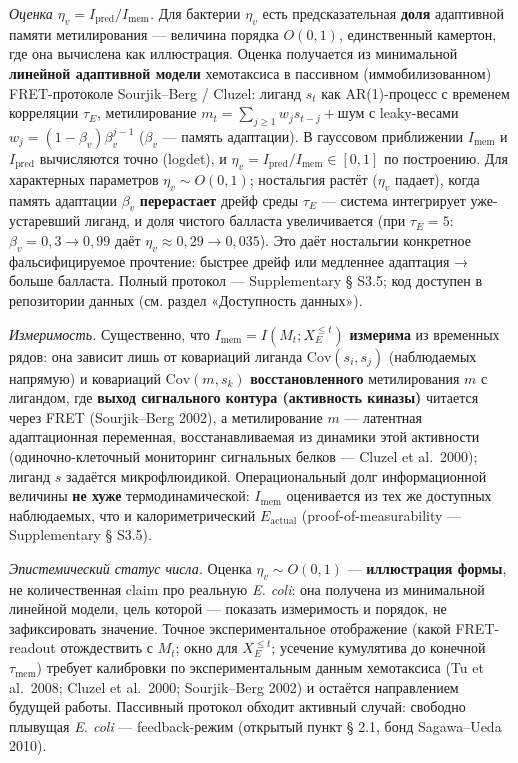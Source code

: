 \documentclass[pdflatex,sn-mathphys-ay]{sn-jnl}
\begin{document}
\emph{Оценка \(\eta_v = I_{\text{pred}}/I_{\text{mem}}\).} Для бактерии \(\eta_v\) есть предсказательная \textbf{доля} адаптивной памяти метилирования --- величина порядка \(O(0{,}1)\), единственный камертон, где она вычислена как иллюстрация. Оценка получается из минимальной \textbf{линейной адаптивной модели} хемотаксиса в пассивном (иммобилизованном) FRET-протоколе Sourjik--Berg / Cluzel: лиганд \(s_t\) как AR(1)-процесс с временем корреляции \(\tau_E\), метилирование \(m_t = \sum_{j \ge 1} w_j s_{t-j} + \text{шум}\) с leaky-весами \(w_j = (1-\beta_v)\beta_v^{j-1}\) (\(\beta_v\) --- память адаптации). В гауссовом приближении \(I_{\text{mem}}\) и \(I_{\text{pred}}\) вычисляются точно (logdet), и \(\eta_v = I_{\text{pred}}/I_{\text{mem}} \in [0, 1]\) по построению. Для характерных параметров \(\eta_v \sim O(0{,}1)\); ностальгия растёт (\(\eta_v\) падает), когда память адаптации \(\beta_v\) \textbf{перерастает} дрейф среды \(\tau_E\) --- система интегрирует уже-устаревший лиганд, и доля чистого балласта увеличивается (при \(\tau_E = 5\): \(\beta_v = 0{,}3 \to 0{,}99\) даёт \(\eta_v \approx 0{,}29 \to 0{,}035\)). Это даёт ностальгии конкретное фальсифицируемое прочтение: быстрее дрейф или медленнее адаптация → больше балласта. Полный протокол --- Supplementary § S3.5; код доступен в репозитории данных (см. раздел «Доступность данных»).

\emph{Измеримость.} Существенно, что \(I_{\text{mem}} = I(M_t; X_E^{\le t})\) \textbf{измерима} из временных рядов: она зависит лишь от ковариаций лиганда \(\text{Cov}(s_i, s_j)\) (наблюдаемых напрямую) и ковариаций \(\text{Cov}(m, s_k)\) \textbf{восстановленного} метилирования \(m\) с лигандом, где \textbf{выход сигнального контура (активность киназы)} читается через FRET (Sourjik--Berg 2002), а метилирование \(m\) --- латентная адаптационная переменная, восстанавливаемая из динамики этой активности (одиночно-клеточный мониторинг сигнальных белков --- Cluzel et al.~2000); лиганд \(s\) задаётся микрофлюидикой. Операциональный долг информационной величины \textbf{не хуже} термодинамической: \(I_{\text{mem}}\) оценивается из тех же доступных наблюдаемых, что и калориметрический \(E_{\text{actual}}\) (proof-of-measurability --- Supplementary § S3.5).

\emph{Эпистемический статус числа.} Оценка \(\eta_v \sim O(0{,}1)\) --- \textbf{иллюстрация формы}, не количественная claim про реальную \emph{E. coli}: она получена из минимальной линейной модели, цель которой --- показать измеримость и порядок, не зафиксировать значение. Точное экспериментальное отображение (какой FRET-readout отождествить с \(M_t\); окно для \(X_E^{\le t}\); усечение кумулятива до конечной \(\tau_{\text{mem}}\)) требует калибровки по экспериментальным данным хемотаксиса (Tu et al.~2008; Cluzel et al.~2000; Sourjik--Berg 2002) и остаётся направлением будущей работы. Пассивный протокол обходит активный случай: свободно плывущая \emph{E. coli} --- feedback-режим (открытый пункт § 2.1, бонд Sagawa--Ueda 2010).
\end{document}
